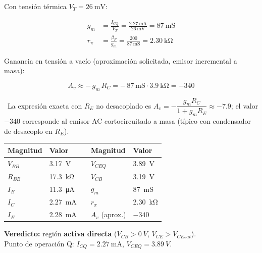 \documentclass[11pt,a4paper]{article}
\begin{document}
Con tensión térmica $V_T = \SI{26}{\milli\volt}$:

\begin{align*}
  g_m &= \frac{I_{CQ}}{V_T} = \frac{\SI{2.27}{\milli\ampere}}{\SI{26}{\milli\volt}}
        = \SI{87}{\milli\siemens}\\
  r_\pi &= \frac{\beta_F}{g_m} = \frac{200}{\SI{87}{\milli\siemens}}
          = \SI{2.30}{\kilo\ohm}
\end{align*}

Ganancia en tensión a vacío (aproximación solicitada, emisor incremental a masa):

\begin{equation*}
  A_v \approx -\, g_m\, R_C = -\,\SI{87}{\milli\siemens}\cdot\SI{3.9}{\kilo\ohm}
        = \boxed{-340}
\end{equation*}

\begin{cajaRecuerda}
~La expresión exacta con $R_E$ no desacoplado es
$A_v = -\dfrac{g_m R_C}{1 + g_m R_E}\approx -7.9$; el valor $-340$ corresponde al
emisor AC cortocircuitado a masa (típico con condensador de desacoplo en $R_E$).
\end{cajaRecuerda}

\begin{tcolorbox}[tarjetaDato, title={\faIcon{clipboard-list}~Resumen de resultados}]
\centering
\begin{tabular}{@{}l l ll l@{}}
\toprule
\textbf{Magnitud} & \textbf{Valor} & \quad & \textbf{Magnitud} & \textbf{Valor}\\
\midrule
$V_{BB}$ & \SI{3.17}{V} & & $V_{CEQ}$ & \SI{3.89}{V}\\
$R_{BB}$ & \SI{17.3}{\kilo\ohm} & & $V_{CB}$ & \SI{3.19}{V}\\
$I_B$ & \SI{11.3}{\micro\ampere} & & $g_m$ & \SI{87}{\milli\siemens}\\
$I_C$ & \SI{2.27}{\milli\ampere} & & $r_\pi$ & \SI{2.30}{\kilo\ohm}\\
$I_E$ & \SI{2.28}{\milli\ampere} & & $A_v$ (aprox.) & $-340$\\
\bottomrule
\end{tabular}

\textbf{Veredicto:} región \textbf{activa directa} ($V_{CB}>\SI{0}{V}$, $V_{CE}>V_{CEsat}$).\\
Punto de operación Q: $I_{CQ}=\SI{2.27}{\milli\ampere}$, $V_{CEQ}=\SI{3.89}{V}$.
\end{tcolorbox}
\end{document}
